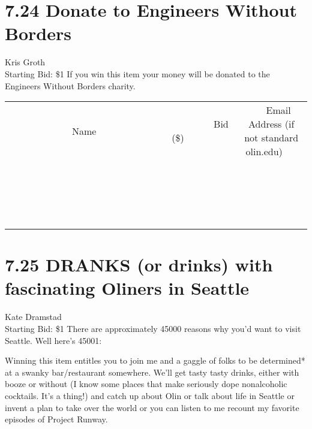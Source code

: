 \documentclass[11pt]{article}
\begin{document}
\section*{7.24 Donate to Engineers Without Borders}
Kris Groth
\\
Starting Bid: \$1
\newline
If you win this item your money will be donated to the Engineers Without Borders charity.
\\[3ex]
\begin{tabular}{c c c}
~~~~~~~~~~~~~Name~~~~~~~~~~~~~ & ~~~~~~~~~Bid (\$)~~~~~~~~~  & ~~~Email Address (if not standard olin.edu)~~~\\
 & & \\
\hline
 & & \\
\hline
 & & \\
\hline
 & & \\
\hline
 & & \\
\hline
 & & \\
\hline
 & & \\
\hline
 & & \\
\hline
 & & \\
\hline
 & & \\
\hline
 & & \\
\hline
 & & \\
\hline
 & & \\
\hline
 & & \\
\hline
 & & \\
\hline
 & & \\
\hline
 & & \\
\hline
 & & \\
\hline
 & & \\
\hline
\end{tabular}
\newpage
\section*{7.25 DRANKS (or drinks) with fascinating Oliners in Seattle}
Kate Dramstad
\\
Starting Bid: \$1
\newline
There are approximately 45000 reasons why you'd want to visit Seattle. Well here's 45001:

Winning this item entitles you to join me and a gaggle of folks to be determined* at a swanky bar/restaurant somewhere. We'll get tasty tasty drinks, either with booze or without (I know some places that make seriously dope nonalcoholic cocktails. It's a thing!) and catch up about Olin or talk about life in Seattle or invent a plan to take over the world or you can listen to me recount my favorite episodes of Project Runway.
\end{document}
